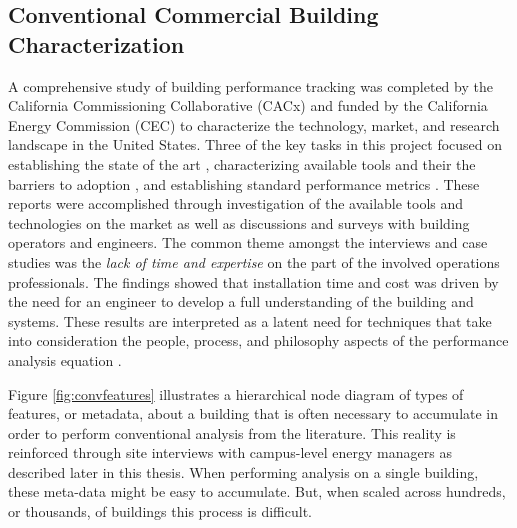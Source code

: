\subsection{Conventional Commercial Building Characterization}
A comprehensive study of building performance tracking was completed by the California Commissioning Collaborative (CACx) and funded by the California Energy Commission (CEC) to characterize the technology, market, and research landscape in the United States. Three of the key tasks in this project focused on establishing the state of the art \cite{effinger_building_2010}, characterizing available tools and their the barriers to adoption \cite{ulickey_building_2010}, and establishing standard performance metrics \cite{greensfelder_building_2010}. These reports were accomplished through investigation of the available tools and technologies on the market as well as discussions and surveys with building operators and engineers. The common theme amongst the interviews and case studies was the \emph{lack of time and expertise} on the part of the involved operations professionals. The findings showed that installation time and cost was driven by the need for an engineer to develop a full understanding of the building and systems. These results are interpreted as a latent need for techniques that take into consideration the people, process, and philosophy aspects of the performance analysis equation \cite{miller_applicability_2013}. 

Figure \ref{fig:convfeatures} illustrates a hierarchical node diagram of types of features, or metadata, about a building that is often necessary to accumulate in order to perform conventional analysis from the literature. This reality is reinforced through site interviews with campus-level energy managers as described later in this thesis. When performing analysis on a single building, these meta-data might be easy to accumulate. But, when scaled across hundreds, or thousands, of buildings this process is difficult.

